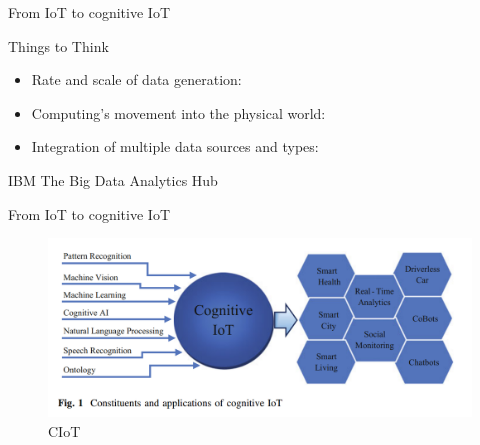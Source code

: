 \documentclass{beamer}
\begin{document}
\begin{frame} {From IoT to cognitive IoT}
   \
   {\Large Things to Think\par}
  
  \vskip 1cm
  \begin{itemize}
      \item Rate and scale of data generation:
      \item Computing’s movement into the physical world:
      \item Integration of multiple data sources and types: 
  \end{itemize}
    \vskip 3cm
    
   {\tiny IBM The Big Data  Analytics Hub\par}  
\end{frame}







\begin{frame}{From IoT to cognitive IoT}
\begin{figure}
\includegraphics[width=1\textwidth]{CIOT1_application.png}
\caption{\label{fig:1} CIoT}
\end{figure}  
\end{frame}
\end{document}
